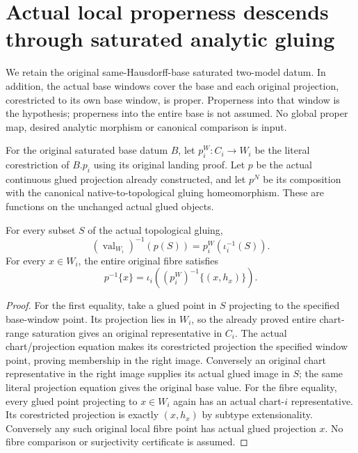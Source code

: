 \section{Actual local properness descends through saturated analytic gluing}

We retain the original same-Hausdorff-base saturated two-model datum. In
addition, the actual base windows cover the base and each original projection,
corestricted to its own base window, is proper. Properness into that window
is the hypothesis; properness into the entire base is not assumed. No global
proper map, desired analytic morphism or canonical comparison is input.

\begin{definition}
\label{hir:disjoint-proper-actual-window-projection}
\leanok
For the original saturated base datum $B$, let $p_i^W:C_i\to W_i$ be the
literal corestriction of $B.p_i$ using its original landing proof. Let $p$
be the actual continuous glued projection already constructed, and let $p^N$
be its composition with the canonical native-to-topological gluing
homeomorphism. These are functions on the unchanged actual glued objects.
\end{definition}

\begin{lemma}
\label{hir:disjoint-proper-entire-window-dictionaries}
\leanok
For every subset $S$ of the actual topological gluing,
\[
 (\operatorname{val}_{W_i})^{-1}(p(S))=p_i^W(\iota_i^{-1}(S)).
\]
For every $x\in W_i$, the entire original fibre satisfies
\[
 p^{-1}\{x\}=\iota_i((p_i^W)^{-1}\{(x,h_x)\}).
\]
\end{lemma}
\begin{proof}
For the first equality, take a glued point in $S$ projecting to the specified
base-window point. Its projection lies in $W_i$, so the already proved
entire chart-range saturation gives an original representative in $C_i$.
The actual chart/projection equation makes its corestricted projection the
specified window point, proving membership in the right image. Conversely
an original chart representative in the right image supplies its actual
glued image in $S$; the same literal projection equation gives the original
base value. For the fibre equality, every glued point projecting to $x\in W_i$
again has an actual chart-$i$ representative. Its corestricted projection
is exactly $(x,h_x)$ by subtype extensionality. Conversely any such original
local fibre point has actual glued projection $x$. No fibre comparison or
surjectivity certificate is assumed.
\end{proof}

